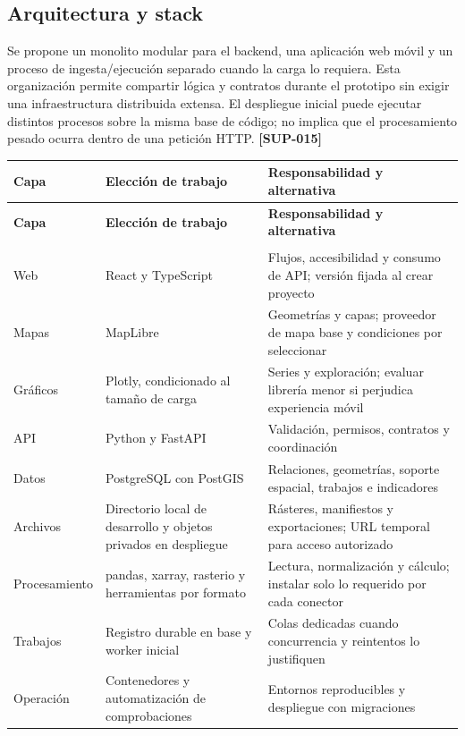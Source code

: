 \documentclass[10pt,a4paper]{article}
\begin{document}
\subsection{Arquitectura y stack}

Se propone un monolito modular para el backend, una aplicación web móvil y un proceso de ingesta/\allowbreak{}ejecución separado cuando la carga lo requiera. Esta organización permite compartir lógica y contratos durante el prototipo sin exigir una infraestructura distribuida extensa. El despliegue inicial puede ejecutar distintos procesos sobre la misma base de código; no implica que el procesamiento pesado ocurra dentro de una petición HTTP. \textbf{[SUP-015]}


\begingroup\small
\begin{longtable}{>{\raggedright\arraybackslash}p{3.647cm}>{\raggedright\arraybackslash}p{5.867cm}>{\raggedright\arraybackslash}p{6.343cm}}
\toprule
\textbf{Capa} & \textbf{Elección de trabajo} & \textbf{Responsabilidad y alternativa} \\
\midrule\endfirsthead
\toprule
\textbf{Capa} & \textbf{Elección de trabajo} & \textbf{Responsabilidad y alternativa} \\
\midrule\endhead
\midrule\multicolumn{3}{r}{\scriptsize Continúa en la página siguiente}\\\endfoot
\bottomrule\endlastfoot
Web & React y TypeScript & Flujos, accesibilidad y consumo de API; versión fijada al crear proyecto \\[3pt]
Mapas & MapLibre & Geometrías y capas; proveedor de mapa base y condiciones por seleccionar \\[3pt]
Gráficos & Plotly, condicionado al tamaño de carga & Series y exploración; evaluar librería menor si perjudica experiencia móvil \\[3pt]
API & Python y FastAPI & Validación, permisos, contratos y coordinación \\[3pt]
Datos & PostgreSQL con PostGIS & Relaciones, geometrías, soporte espacial, trabajos e indicadores \\[3pt]
Archivos & Directorio local de desarrollo y objetos privados en despliegue & Rásteres, manifiestos y exportaciones; URL temporal para acceso autorizado \\[3pt]
Procesamiento & pandas, xarray, rasterio y herramientas por formato & Lectura, normalización y cálculo; instalar solo lo requerido por cada conector \\[3pt]
Trabajos & Registro durable en base y worker inicial & Colas dedicadas cuando concurrencia y reintentos lo justifiquen \\[3pt]
Operación & Contenedores y automatización de comprobaciones & Entornos reproducibles y despliegue con migraciones \\[3pt]
\end{longtable}
\endgroup
\end{document}
